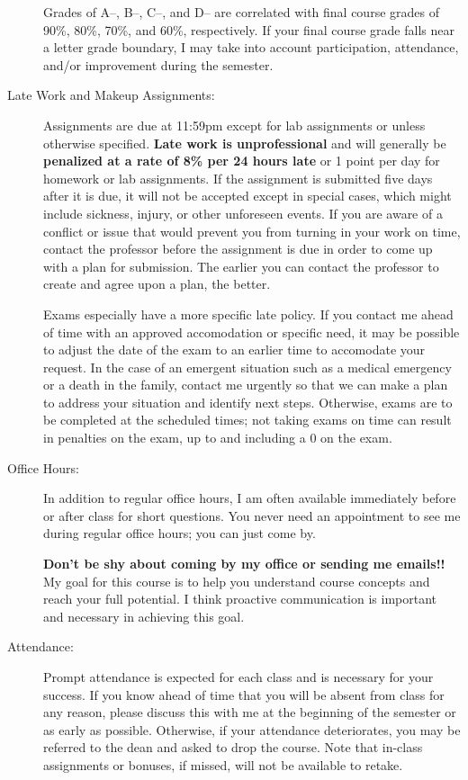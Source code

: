 \documentclass [letterpaper,11pt]{article}
\begin{document}
\begin{description}
Grades of A--, B--, C--, and D-- are correlated with final course grades of 90\%, 80\%,
70\%, and 60\%, respectively.  If your final course grade falls near a letter grade boundary,
I may take into account participation, attendance, and/or improvement during the semester.

\item[Late Work and Makeup Assignments:]
Assignments are due at 11:59pm except for lab assignments or unless otherwise specified.  \textbf{Late work
is unprofessional} and will generally be \textbf{penalized at a rate of 8\% per 24 hours late} or 1 point per day for homework or lab assignments.  If the assignment is submitted five days after it is due, it will not be accepted except in special cases, which might include sickness, injury, or other unforeseen events. If you are aware of a conflict or issue that would prevent you from turning in your work on time, contact the professor before the assignment is due in order to come up with a plan for submission.  The earlier you can contact the professor to create and agree upon a plan, the better.

Exams especially have a more specific late policy.  If you contact me ahead of time with an approved accomodation or specific need, it may be possible to adjust the date of the exam to an earlier time to accomodate your request.  In the case of an emergent situation such as a medical emergency or a death in the family, contact me urgently so that we can make a plan to address your situation and identify next steps.  Otherwise, exams are to be completed at the scheduled times; not taking exams on time can result in penalties on the exam, up to and including a 0 on the exam.

\item[Office Hours:]
In addition to regular office hours, I am often available immediately before or after class for 
short questions.  You never need an appointment to see me during regular office hours; you
can just come by.  

\textbf{Don't be shy about coming by my office or sending me emails!!}  My goal for this course is to help you understand course concepts and reach your full potential. I think proactive communication is important and necessary in achieving this goal.


\item[Attendance:]
Prompt attendance is expected for each class and is necessary for your success. If you know ahead of time that you will be
absent from class for any reason, please discuss this with me at the beginning of the semester
or as early as possible. Otherwise, if your attendance deteriorates, you may be referred to the dean and asked to drop the course. Note that in-class assignments or bonuses, if missed, will not be available to retake.


\end{description}
\end{document}
